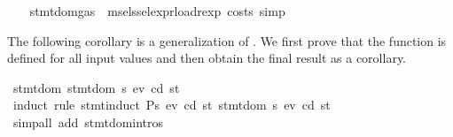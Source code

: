 \begin{isabellebody}
\ \ \isamarkupfalse%
\ {\isacharparenleft}{\kern0pt}{\isacharparenleft}{\kern0pt}stmt{\isacharunderscore}{\kern0pt}dom{\isacharunderscore}{\kern0pt}gas\ {\isacharbar}{\kern0pt}\ msel{\isacharunderscore}{\kern0pt}ssel{\isacharunderscore}{\kern0pt}expr{\isacharunderscore}{\kern0pt}load{\isacharunderscore}{\kern0pt}rexp{\isacharparenright}{\kern0pt}{\isacharplus}{\kern0pt}{\isacharcomma}{\kern0pt}\ costs{\isacharquery}{\kern0pt}{\isacharcomma}{\kern0pt}\ simp{\isacharparenright}{\kern0pt}{\isacharplus}{\kern0pt}\isanewline
\ \ \isamarkupfalse%
%
\endisatagproof
{\isafoldproof}%
%
\isadelimproof
%
\endisadelimproof
%
\isadelimdocument
%
\endisadelimdocument
%
\isatagdocument
%
\isamarkuptrue%
%
\endisatagdocument
{\isafolddocument}%
%
\isadelimdocument
%
\endisadelimdocument
%
\begin{isamarkuptext}%
The following corollary is a generalization of .
  We first prove that the function is defined for all input values and then obtain the final result as a corollary.%
\end{isamarkuptext}\isamarkuptrue%
\isamarkupfalse%
\ stmt{\isacharunderscore}{\kern0pt}dom{\isacharcolon}{\kern0pt}\ {\isachardoublequoteopen}stmt{\isacharunderscore}{\kern0pt}dom\ {\isacharparenleft}{\kern0pt}s{}{\isacharcomma}{\kern0pt}\ ev{}{\isacharcomma}{\kern0pt}\ cd{}{\isacharcomma}{\kern0pt}\ st{}{\isacharparenright}{\kern0pt}{\isachardoublequoteclose}\isanewline
%
\isadelimproof
\ \ %
\endisadelimproof
%
\isatagproof
{}\isamarkupfalse%
\ {\isacharparenleft}{\kern0pt}induct\ rule{\isacharcolon}{\kern0pt}\ stmt{\isachardot}{\kern0pt}induct{\isacharbrackleft}{\kern0pt}\ {\isacharquery}{\kern0pt}P{\isacharequal}{\kern0pt}{\isachardoublequoteopen}{\isasymlambda}s{}\ ev{}\ cd{}\ st{}{\isachardot}{\kern0pt}\ stmt{\isacharunderscore}{\kern0pt}dom\ {\isacharparenleft}{\kern0pt}s{}{\isacharcomma}{\kern0pt}\ ev{}{\isacharcomma}{\kern0pt}\ cd{}{\isacharcomma}{\kern0pt}\ st{}{\isacharparenright}{\kern0pt}{\isachardoublequoteclose}{\isacharbrackright}{\kern0pt}{\isacharparenright}{\kern0pt}\isanewline
\ \ \isamarkupfalse%
\ {\isacharparenleft}{\kern0pt}simp{\isacharunderscore}{\kern0pt}all\ add{\isacharcolon}{\kern0pt}\ stmt{\isachardot}{\kern0pt}domintros{\isacharparenleft}{\kern0pt}{}{\isacharminus}{\kern0pt}{}{}{\isacharparenright}{\kern0pt}{\isacharparenright}{\kern0pt}\isanewline

\end{isabellebody}
